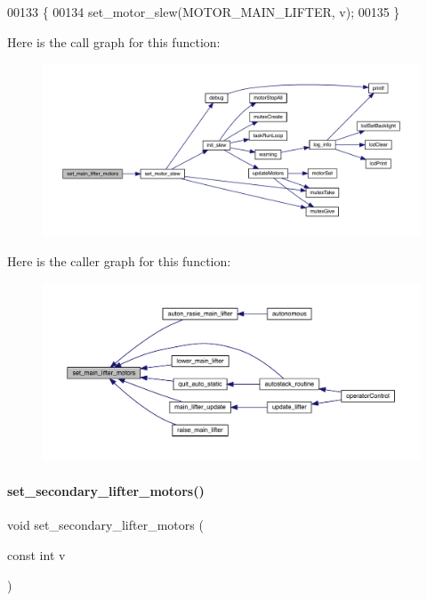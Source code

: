 \begin{DoxyCode}
00133                                          \{
00134   set_motor_slew(MOTOR\_MAIN\_LIFTER, v);
00135 \}
\end{DoxyCode}
Here is the call graph for this function\+:
\nopagebreak
\begin{figure}[H]
\begin{center}
\leavevmode
\includegraphics[width=350pt]{lifter_8h_ad00a195af30f246924d6e1a30095b882_cgraph}
\end{center}
\end{figure}
Here is the caller graph for this function\+:
\nopagebreak
\begin{figure}[H]
\begin{center}
\leavevmode
\includegraphics[width=350pt]{lifter_8h_ad00a195af30f246924d6e1a30095b882_icgraph}
\end{center}
\end{figure}
\mbox{\label{lifter_8h_a78640d547d9361951a92d0bc00939536}} 
\paragraph{set\+\_\+secondary\+\_\+lifter\+\_\+motors()}
{\footnotesize\ttfamily void set\+\_\+secondary\+\_\+lifter\+\_\+motors (\begin{DoxyParamCaption}\item[{const int}]{v }\end{DoxyParamCaption})}



